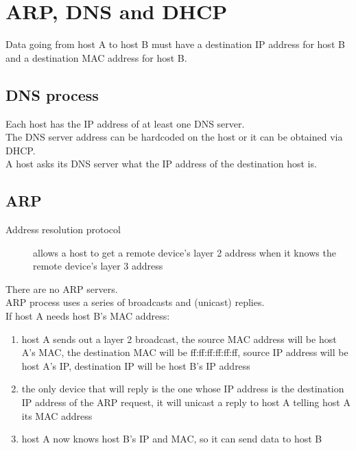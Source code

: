 \section{ARP, DNS and DHCP}

Data going from host A to host B must have a destination IP address for host B
and a destination MAC address for host B.

\subsection{DNS process}

Each host has the IP address of at least one DNS server.\\

The DNS server address can be hardcoded on the host or it can be obtained
via DHCP.\\

A host asks its DNS server what the IP address of the destination host is.

\subsection{ARP}

\begin{description}

\item[Address resolution protocol]
allows a host to get a remote device's layer 2 address when it knows the
remote device's layer 3 address

\end{description}

There are no ARP servers.\\

ARP process uses a series of broadcasts and (unicast) replies.\\

If host A needs host B's MAC address:

\begin{enumerate}

\item host A sends out a layer 2 broadcast, the source MAC address will be
host A's MAC, the destination MAC will be ff:ff:ff:ff:ff:ff, source IP address
will be host A's IP, destination IP will be host B's IP address

\item the only device that will reply is the one whose IP address is the
destination IP address of the ARP request, it will unicast a reply to host A
telling host A its MAC address

\item host A now knows host B's IP and MAC, so it can send data to host B

\end{enumerate}

